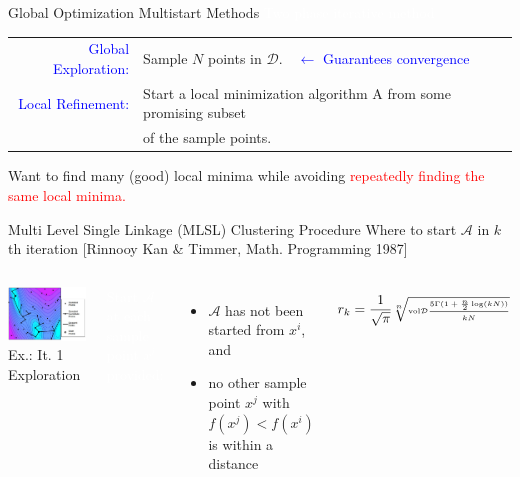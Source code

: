 \documentclass[handout,aspectratio=54]{beamer}
\numberwithin{theorem}{section}
\begin{document}
\begin{frame}{Global Optimization Multistart Methods}
\colorbox[rgb]{0.5,0.6,0.7}{\textcolor{white}{Two phase iterative method}}

\begin{table}[]\scriptsize
\begin{tabular}{rl}
\textcolor{blue}{Global Exploration:} & Sample $N$ points in $\mathcal{D}$.$\quad$\textcolor{blue}{$\leftarrow$ Guarantees convergence}\\
\textcolor{blue}{Local Refinement: } & Start a local minimization algorithm A from some promising subset\\
&of the sample points.
\end{tabular}
\end{table}

\footnotesize
Want to find many (good) local minima while avoiding \textcolor{red}{repeatedly finding the same local minima.}
\end{frame}

\begin{frame}{Multi Level Single Linkage (MLSL) Clustering Procedure}
\small
Where to start $\mathcal{A}$ in $k$th iteration \scriptsize\textcolor[RGB]{128,0,128}{ [Rinnooy Kan \& Timmer, Math. Programming 1987]}
\normalsize

\begin{columns}
\includegraphics[width=\textwidth]{fig/39-1.jpg}
Ex.: It. 1 Exploration

\colorbox[rgb]{0.5,0.6,0.7}{\textcolor{white}{Start $\mathcal{A}$ at each sample point}}
\colorbox[rgb]{0.5,0.6,0.7}{\textcolor{white}{$x^i$ provided:}}

\begin{itemize}
\item $\mathcal{A}$ has not been started from $x^i$, and
\item no other sample point $x^j$ with $f(x^j)<f(x^i)$ is within a distance
\end{itemize}
\begin{equation*}\tiny
r_k=\frac{1}{\sqrt{\pi}}\sqrt[n]{\textup{vol}\mathcal{D}\frac{5\Gamma(1+\frac{n}{2}\log(kN))}{kN}}
\end{equation*}
\end{columns}
\vspace{0.5cm}
\end{frame}
\end{document}
